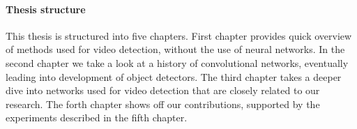 

\paragraph{Thesis structure}
This thesis is structured into five chapters. First chapter provides quick overview of methods used for video detection, without the use of neural networks. In the second chapter we take a look at a history of convolutional networks, eventually leading into development of object detectors. The third chapter takes a deeper dive into networks used for video detection that are closely related to our research. The forth chapter shows off our contributions, supported by the experiments described in the fifth chapter.